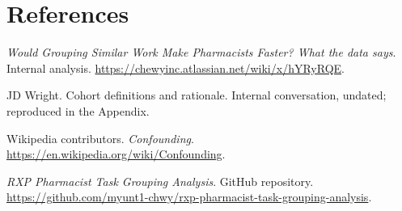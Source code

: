 \documentclass[
  10pt,
]{article}
\begin{document}
\section{References}\label{references}
\begin{enumerate}[label={[\arabic*]},leftmargin=*]
\item \label{ref:grouping-similar-work}\emph{Would Grouping Similar Work Make Pharmacists Faster? What the data says}. Internal analysis. \url{https://chewyinc.atlassian.net/wiki/x/hYRyRQE}.
\item JD Wright. Cohort definitions and rationale. Internal conversation, undated; reproduced in the Appendix.
\item \label{ref:confounding}Wikipedia contributors. \emph{Confounding}. \url{https://en.wikipedia.org/wiki/Confounding}.
\item \label{ref:analysis-repository}\emph{RXP Pharmacist Task Grouping Analysis}. GitHub repository. \url{https://github.com/myunt1-chwy/rxp-pharmacist-task-grouping-analysis}.
\end{enumerate}
\end{document}
